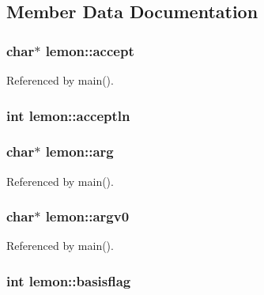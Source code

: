 \subsection{Member Data Documentation}
\hypertarget{structlemon_ae26bcb5ffb57001afb97871a54a4013e}{
\subsubsection[{accept}]{\setlength{\rightskip}{0pt plus 5cm}char$\ast$ lemon\-::accept}}\label{structlemon_ae26bcb5ffb57001afb97871a54a4013e}


Referenced by main().

\hypertarget{structlemon_a0bd3f987e1b5b51e4fefde9c9ff44e17}{
\subsubsection[{acceptln}]{\setlength{\rightskip}{0pt plus 5cm}int lemon\-::acceptln}}\label{structlemon_a0bd3f987e1b5b51e4fefde9c9ff44e17}
\hypertarget{structlemon_afbb9017cbf48aadc1fce940098f3fcab}{
\subsubsection[{arg}]{\setlength{\rightskip}{0pt plus 5cm}char$\ast$ lemon\-::arg}}\label{structlemon_afbb9017cbf48aadc1fce940098f3fcab}


Referenced by main().

\hypertarget{structlemon_a7198552f1e854047e0bdc05b81754191}{
\subsubsection[{argv0}]{\setlength{\rightskip}{0pt plus 5cm}char$\ast$ lemon\-::argv0}}\label{structlemon_a7198552f1e854047e0bdc05b81754191}


Referenced by main().

\hypertarget{structlemon_a0052dcc4fbedb0f8bd3ccaef3f7d3c5f}{
\subsubsection[{basisflag}]{\setlength{\rightskip}{0pt plus 5cm}int lemon\-::basisflag}}\label{structlemon_a0052dcc4fbedb0f8bd3ccaef3f7d3c5f}



